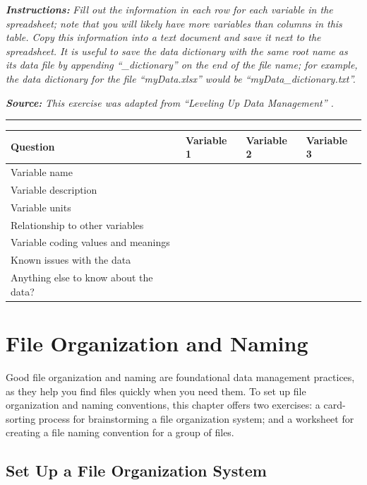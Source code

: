 \documentclass[
]{book}
\begin{document}
\textbf{\emph{Instructions:}} \emph{Fill out the information in each row for each variable in the spreadsheet; note that you will likely have more variables than columns in this table. Copy this information into a text document and save it next to the spreadsheet. It is useful to save the data dictionary with the same root name as its data file by appending ``\_dictionary'' on the end of the file name; for example, the data dictionary for the file ``myData.xlsx'' would be ``myData\_dictionary.txt''.}

\textbf{\emph{Source:}} \emph{This exercise was adapted from ``Leveling Up Data Management'' \citep{briney_leveling_2023}.}

\begin{center}\rule{0.5\linewidth}{0.5pt}\end{center}

\begin{tabular}{l|l|l|l}
\hline
Question & Variable 1 & Variable 2 & Variable 3\\
\hline
Variable name &  &  & \\
\hline
Variable description &  &  & \\
\hline
Variable units &  &  & \\
\hline
Relationship to other variables &  &  & \\
\hline
Variable coding values and meanings &  &  & \\
\hline
Known issues with the data &  &  & \\
\hline
Anything else to know about the data? &  &  & \\
\hline
\end{tabular}

\hypertarget{file-organization-and-naming}{%
\chapter{File Organization and Naming}\label{file-organization-and-naming}}

Good file organization and naming are foundational data management practices, as they help you find files quickly when you need them. To set up file organization and naming conventions, this chapter offers two exercises: a card-sorting process for brainstorming a file organization system; and a worksheet for creating a file naming convention for a group of files.

\hypertarget{file-organization}{%
\section{Set Up a File Organization System}\label{file-organization}}
\end{document}
